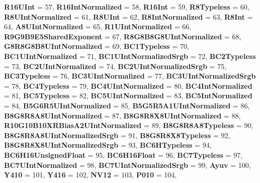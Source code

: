 \begin{DoxyCompactItemize}
\newline
{\bfseries R16\+U\+Int} = 57, 
{\bfseries R16\+Int\+Normalized} = 58, 
{\bfseries R16\+Int} = 59, 
{\bfseries R8\+Typeless} = 60, 
\newline
{\bfseries R8\+U\+Int\+Normalized} = 61, 
{\bfseries R8\+U\+Int} = 62, 
{\bfseries R8\+Int\+Normalized} = 63, 
{\bfseries R8\+Int} = 64, 
\newline
{\bfseries A8\+U\+Int\+Normalized} = 65, 
{\bfseries R1\+U\+Int\+Normalized} = 66, 
{\bfseries R9\+G9\+B9\+E5\+Shared\+Exponent} = 67, 
{\bfseries R8\+G8\+B8\+G8\+U\+Int\+Normalized} = 68, 
\newline
{\bfseries G8\+R8\+G8\+B8\+U\+Int\+Normalized} = 69, 
{\bfseries B\+C1\+Typeless} = 70, 
{\bfseries B\+C1\+U\+Int\+Normalized} = 71, 
{\bfseries B\+C1\+U\+Int\+Normalized\+Srgb} = 72, 
\newline
{\bfseries B\+C2\+Typeless} = 73, 
{\bfseries B\+C2\+U\+Int\+Normalized} = 74, 
{\bfseries B\+C2\+U\+Int\+Normalized\+Srgb} = 75, 
{\bfseries B\+C3\+Typeless} = 76, 
\newline
{\bfseries B\+C3\+U\+Int\+Normalized} = 77, 
{\bfseries B\+C3\+U\+Int\+Normalized\+Srgb} = 78, 
{\bfseries B\+C4\+Typeless} = 79, 
{\bfseries B\+C4\+U\+Int\+Normalized} = 80, 
\newline
{\bfseries B\+C4\+Int\+Normalized} = 81, 
{\bfseries B\+C5\+Typeless} = 82, 
{\bfseries B\+C5\+U\+Int\+Normalized} = 83, 
{\bfseries B\+C5\+Int\+Normalized} = 84, 
\newline
{\bfseries B5\+G6\+R5\+U\+Int\+Normalized} = 85, 
{\bfseries B5\+G5\+R5\+A1\+U\+Int\+Normalized} = 86, 
{\bfseries B8\+G8\+R8\+A8\+U\+Int\+Normalized} = 87, 
{\bfseries B8\+G8\+R8\+X8\+U\+Int\+Normalized} = 88, 
\newline
{\bfseries R10\+G10\+B10\+X\+R\+Bias\+A2\+U\+Int\+Normalized} = 89, 
{\bfseries B8\+G8\+R8\+A8\+Typeless} = 90, 
{\bfseries B8\+G8\+R8\+A8\+U\+Int\+Normalized\+Srgb} = 91, 
{\bfseries B8\+G8\+R8\+X8\+Typeless} = 92, 
\newline
{\bfseries B8\+G8\+R8\+X8\+U\+Int\+Normalized\+Srgb} = 93, 
{\bfseries B\+C6\+H\+Typeless} = 94, 
{\bfseries B\+C6\+H16\+Unsigned\+Float} = 95, 
{\bfseries B\+C6\+H16\+Float} = 96, 
\newline
{\bfseries B\+C7\+Typeless} = 97, 
{\bfseries B\+C7\+U\+Int\+Normalized} = 98, 
{\bfseries B\+C7\+U\+Int\+Normalized\+Srgb} = 99, 
{\bfseries Ayuv} = 100, 
\newline
{\bfseries Y410} = 101, 
{\bfseries Y416} = 102, 
{\bfseries N\+V12} = 103, 
{\bfseries P010} = 104, 

\end{DoxyCompactItemize}
